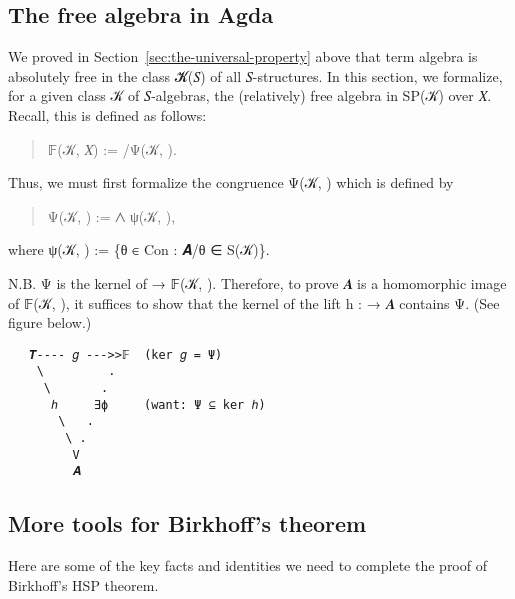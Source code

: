 \documentclass[a4paper,USenglish,cleveref,autoref,thm-restate]{lipics-v2019}
\begin{document}

\subsection{The free algebra in Agda}\label{sec:the-free-algebra-in-agda}
We proved in Section~\ref{sec:the-universal-property} above that term algebra \TX is absolutely free in the class \AB 𝓚(\AB 𝑆) of all \AB 𝑆-structures. In this section, we formalize, for a given class \AB 𝒦 of \AB 𝑆-algebras, the (relatively) free algebra in SP(\AB 𝒦) over \AB 𝑋. Recall, this is defined as follows:
\begin{quote}
𝔽(\AB 𝒦, \AB 𝑋) := \TX/\AB Ψ(\AB 𝒦, \TX).
\end{quote}
Thus, we must first formalize the congruence \AB Ψ(\AB 𝒦, \TX) which is defined by
\begin{quote}
Ψ(\AB 𝒦, \TX) := ⋀ ψ(\AB 𝒦, \TX),
\end{quote}
where ψ(\AB 𝒦, \TX) := \{θ ∈ Con \TX : \AB 𝑨/θ ∈ S(\AB 𝒦)\}.
\begin{code}\end{code}

N.B. Ψ is the kernel of \TX → 𝔽(\AB 𝒦, \TX). Therefore, to prove \AB 𝑨 is a homomorphic image of 𝔽(\AB 𝒦, \TX), it suffices to show that the kernel of the lift \AB h : \TX → \AB 𝑨 contains Ψ. (See figure below.)

\begin{verbatim}
   𝑻---- 𝑔 --->>𝔽  (ker 𝑔 = Ψ)
    \         .
     \       .
      ℎ     ∃ϕ     (want: Ψ ⊆ ker ℎ)
       \   .
        \ .
         V
         𝑨
\end{verbatim}

\subsection{More tools for Birkhoff's theorem}\label{sec:more-tools-for-birkhoffs-theorem}
Here are some of the key facts and identities we need to complete the proof of Birkhoff's HSP theorem.
\begin{code}\end{code}
\end{document}
